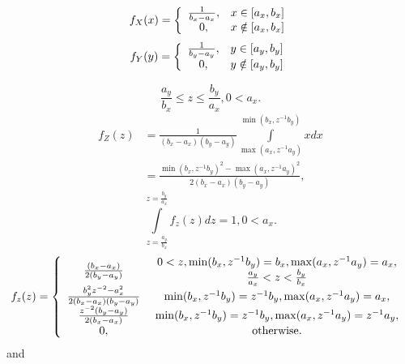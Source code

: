 \documentclass[titlepage,fleqn]{article}%
\begin{document}
\label{UD}%


\bigskip%

\[
f_{X}(x)=\left\{
\begin{array}
[c]{cc}%
\frac{1}{b_{x}-a_{x}}, & x\in\lbrack a_{x},b_{x}]\\
0, & x\notin\lbrack a_{x},b_{x}]
\end{array}
\right.
\]%
\[
f_{Y}(y)=\left\{
\begin{array}
[c]{cc}%
\frac{1}{b_{y}-a_{y}}, & y\in\lbrack a_{y},b_{y}]\\
0, & y\notin\lbrack a_{y},b_{y}]
\end{array}
\right.
\]
%

\[
\frac{a_{y}}{b_{x}}\leq z\leq\frac{b_{y}}{a_{x}},0<a_{x}.
\]%
\begin{align*}
f_{Z}(z)  &  =\frac{1}{\left(  b_{x}-a_{x}\right)  \left(  b_{y}-a_{y}\right)
}%
{\displaystyle\int\limits_{\max(a_{x},z^{-1}a_{y})}^{\min(b_{x},z^{-1}b_{y})}}
xdx\\
&  =\frac{\min(b_{x},z^{-1}b_{y})^{2}-\max(a_{x},z^{-1}a_{y})^{2}}{2\left(
b_{x}-a_{x}\right)  \left(  b_{y}-a_{y}\right)  },
\end{align*}%
\[%
{\displaystyle\int\limits_{z=\frac{a_{y}}{b_{x}}}^{z=\frac{b_{y}}{a_{x}}}}
f_{z}(z)dz=1,0<a_{x}.
\]%
\[
f_{z}(z)=\left\{
\begin{array}
[c]{cc}%
\frac{\left(  b_{x}-a_{x}\right)  }{2\left(  b_{y}-a_{y}\right)  } &
\begin{array}
[c]{c}%
0<z,\min(b_{x},z^{-1}b_{y})=b_{x},\max(a_{x},z^{-1}a_{y})=a_{x},\\
\frac{a_{y}}{a_{x}}<z<\frac{b_{y}}{b_{x}}%
\end{array}
\\
\frac{b_{y}^{2}z^{-2}-a_{x}^{2}}{2\left(  b_{x}-a_{x}\right)  \left(
b_{y}-a_{y}\right)  } & \min(b_{x},z^{-1}b_{y})=z^{-1}b_{y},\max(a_{x}%
,z^{-1}a_{y})=a_{x},\\
\frac{z^{-2}\left(  b_{y}-a_{y}\right)  }{2\left(  b_{x}-a_{x}\right)  } &
\min(b_{x},z^{-1}b_{y})=z^{-1}b_{y},\max(a_{x},z^{-1}a_{y})=z^{-1}a_{y},\\
0, & \text{otherwise.}%
\end{array}
\right.
\]
and%
\end{document}
